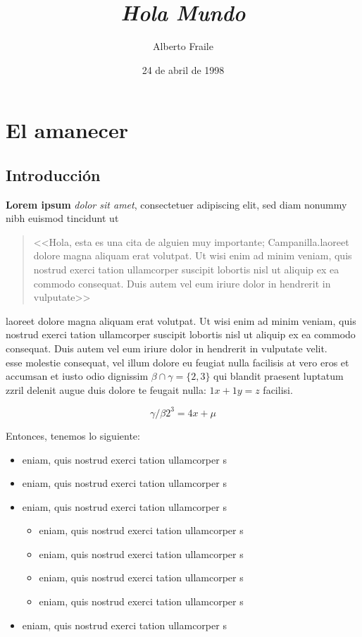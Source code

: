 \documentclass[a4paper, 11pt, titlepage, twocolumn]{book}
\title{\textit{Hola Mundo}}
\author{Alberto Fraile}
\date{24 de abril de 1998}
\begin{document}
\maketitle
\tableofcontents
\newpage

\chapter{El amanecer}
\section{Introducción}

\textbf{Lorem ipsum} \textit{dolor sit amet}, consectetuer 
adipiscing elit, sed diam nonummy nibh euismod tincidunt ut 

\begin{quote}
    \small <<Hola, esta es una cita de alguien muy importante; Campanilla.laoreet dolore magna aliquam erat volutpat. Ut wisi enim ad 
    minim veniam, quis nostrud exerci tation ullamcorper suscipit 
    lobortis nisl ut aliquip ex ea commodo consequat. Duis autem 
    vel eum iriure dolor in hendrerit in vulputate>>
\end{quote}

laoreet dolore magna aliquam erat volutpat. Ut wisi enim ad 
minim veniam, quis nostrud exerci tation ullamcorper suscipit 
lobortis nisl ut aliquip ex ea commodo consequat. Duis autem 
vel eum iriure dolor in hendrerit in vulputate velit. \\ esse molestie 
consequat, vel illum dolore eu feugiat nulla facilisis at vero eros 
et accumsan et iusto odio dignissim $\beta \cap \gamma = \{2,3\}$ qui blandit praesent luptatum 
zzril delenit augue duis dolore te feugait nulla: $1x + 1y = z$ facilisi.

\[ \gamma / \beta 2^3 = 4x + \mu \]

Entonces, tenemos lo siguiente:

\begin{itemize}
    \item eniam, quis nostrud exerci tation ullamcorper s
    \item eniam, quis nostrud exerci tation ullamcorper s
    \item eniam, quis nostrud exerci tation ullamcorper s
    \begin{itemize}
        \item eniam, quis nostrud exerci tation ullamcorper s
        \item eniam, quis nostrud exerci tation ullamcorper s
        \item eniam, quis nostrud exerci tation ullamcorper s
        \item eniam, quis nostrud exerci tation ullamcorper s
    \end{itemize}
    \item eniam, quis nostrud exerci tation ullamcorper s
\end{itemize}
\end{document}
